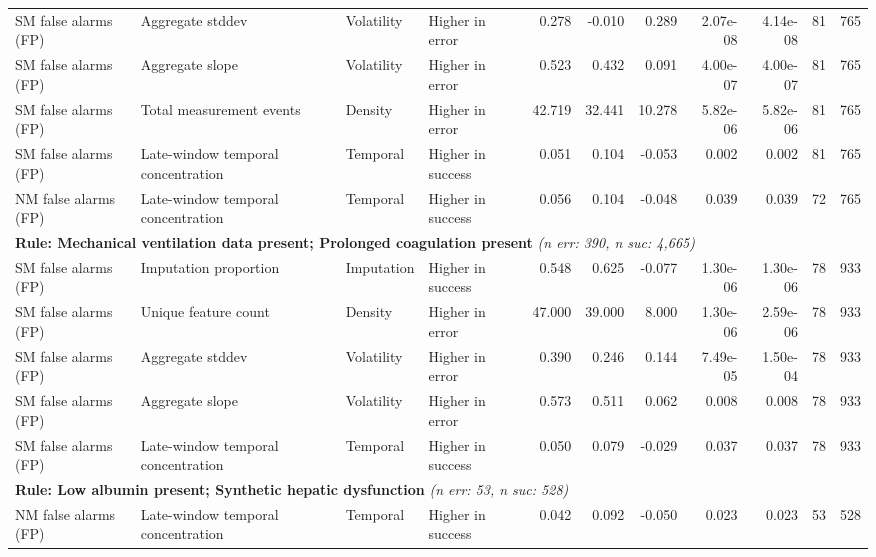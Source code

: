 \documentclass[border=0pt]{standalone}
\begin{document}
\begin{adjustbox}{width=\textwidth}
\begin{tabular}{@{}llllrrrrrrr@{}}
SM false alarms (FP) & Aggregate stddev & Volatility & Higher in error & 0.278 & -0.010 & 0.289 & 2.07e-08 & 4.14e-08 & 81 & 765 \\
SM false alarms (FP) & Aggregate slope & Volatility & Higher in error & 0.523 & 0.432 & 0.091 & 4.00e-07 & 4.00e-07 & 81 & 765 \\
SM false alarms (FP) & Total measurement events & Density & Higher in error & 42.719 & 32.441 & 10.278 & 5.82e-06 & 5.82e-06 & 81 & 765 \\
SM false alarms (FP) & Late-window temporal concentration & Temporal & Higher in success & 0.051 & 0.104 & -0.053 & 0.002 & 0.002 & 81 & 765 \\
NM false alarms (FP) & Late-window temporal concentration & Temporal & Higher in success & 0.056 & 0.104 & -0.048 & 0.039 & 0.039 & 72 & 765 \\
\multicolumn{11}{l}{\textbf{Rule: Mechanical ventilation data present; Prolonged coagulation present} \textit{(n err: 390, n suc: 4,665)}} \\
SM false alarms (FP) & Imputation proportion & Imputation & Higher in success & 0.548 & 0.625 & -0.077 & 1.30e-06 & 1.30e-06 & 78 & 933 \\
SM false alarms (FP) & Unique feature count & Density & Higher in error & 47.000 & 39.000 & 8.000 & 1.30e-06 & 2.59e-06 & 78 & 933 \\
SM false alarms (FP) & Aggregate stddev & Volatility & Higher in error & 0.390 & 0.246 & 0.144 & 7.49e-05 & 1.50e-04 & 78 & 933 \\
SM false alarms (FP) & Aggregate slope & Volatility & Higher in error & 0.573 & 0.511 & 0.062 & 0.008 & 0.008 & 78 & 933 \\
SM false alarms (FP) & Late-window temporal concentration & Temporal & Higher in success & 0.050 & 0.079 & -0.029 & 0.037 & 0.037 & 78 & 933 \\
\multicolumn{11}{l}{\textbf{Rule: Low albumin present; Synthetic hepatic dysfunction} \textit{(n err: 53, n suc: 528)}} \\
NM false alarms (FP) & Late-window temporal concentration & Temporal & Higher in success & 0.042 & 0.092 & -0.050 & 0.023 & 0.023 & 53 & 528 \\
\bottomrule
\end{tabular}
\end{adjustbox}
\end{document}
